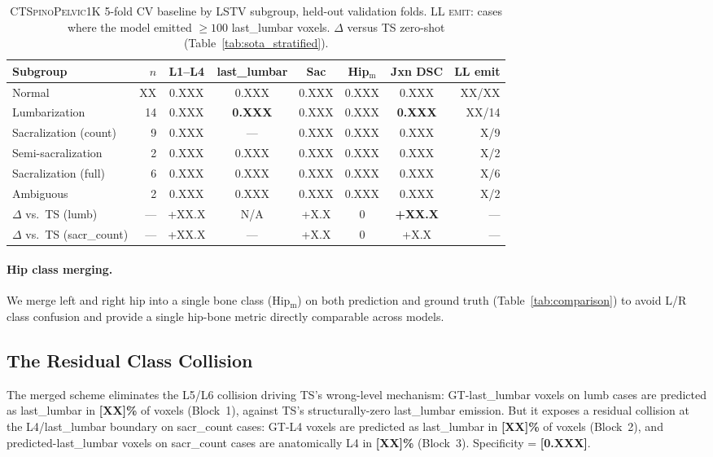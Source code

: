 \documentclass{article}
\newcommand{\dataset}{\textsc{CTSpinoPelvic1K}}
\newcommand{\sota}{TS}
\begin{document}
\begin{table}[t]
\caption{\dataset{} 5-fold CV baseline by LSTV subgroup,
held-out validation folds. \textsc{LL emit}: cases where
the model emitted $\geq 100$ last\_lumbar voxels.
$\Delta$ versus \sota{} zero-shot
(Table~\ref{tab:sota_stratified}).}
\label{tab:baseline}
\centering
\small
\begin{tabular}{lrcccccr}
\toprule
\bfseries Subgroup & \bfseries $n$ &
\bfseries L1--L4 & \bfseries last\_lumbar & \bfseries Sac &
\bfseries Hip$_\text{m}$ & \bfseries Jxn DSC & \bfseries LL emit \\
\midrule
Normal                  & XX & 0.XXX & 0.XXX & 0.XXX & 0.XXX & 0.XXX & XX/XX \\
Lumbarization           & 14 & 0.XXX & \textbf{0.XXX} & 0.XXX & 0.XXX & \textbf{0.XXX} & XX/14 \\
Sacralization (count)   &  9 & 0.XXX & ---   & 0.XXX & 0.XXX & 0.XXX & X/9   \\
Semi-sacralization      &  2 & 0.XXX & 0.XXX & 0.XXX & 0.XXX & 0.XXX & X/2   \\
Sacralization (full)    &  6 & 0.XXX & 0.XXX & 0.XXX & 0.XXX & 0.XXX & X/6   \\
Ambiguous               &  2 & 0.XXX & 0.XXX & 0.XXX & 0.XXX & 0.XXX & X/2   \\
\midrule
$\Delta$ vs.\ \sota{} (lumb)        & --- & +XX.X & N/A & +X.X & 0 & \textbf{+XX.X} & --- \\
$\Delta$ vs.\ \sota{} (sacr\_count) & --- & +XX.X & --- & +X.X & 0 & +X.X    & --- \\
\bottomrule
\end{tabular}
\end{table}

\paragraph{Hip class merging.}
\label{sec:hip_laterality}
We merge left and right hip into a single bone class
(Hip$_\text{m}$) on both prediction and ground truth
(Table~\ref{tab:comparison}) to avoid L/R class confusion
and provide a single hip-bone metric directly comparable
across models.

\subsection{The Residual Class Collision}
\label{sec:residual}

The merged scheme eliminates the L5/L6 collision driving
\sota{}'s wrong-level mechanism: GT-last\_lumbar voxels on
lumb cases are predicted as last\_lumbar in
\textbf{[XX]\%} of voxels (Block~1), against \sota{}'s
structurally-zero last\_lumbar emission. But it exposes a
residual collision at the L4/last\_lumbar boundary on
sacr\_count cases: GT-L4 voxels are predicted as
last\_lumbar in \textbf{[XX]\%} of voxels (Block~2), and
predicted-last\_lumbar voxels on sacr\_count cases are
anatomically L4 in \textbf{[XX]\%} (Block~3).
Specificity = \textbf{[0.XXX]}.
\end{document}
